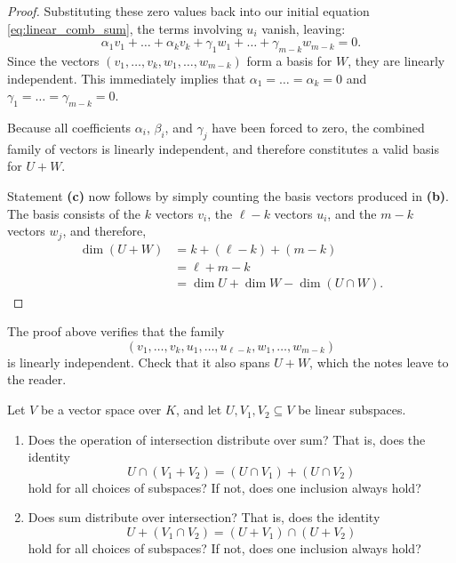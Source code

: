 \begin{proof}
Substituting these zero values back into our initial equation \eqref{eq:linear_comb_sum}, the terms involving $u_i$ vanish, leaving:
\[
\alpha_1 v_1 + \dots + \alpha_k v_k + \gamma_1 w_1 + \dots + \gamma_{m-k} w_{m-k} = 0.
\]
Since the vectors $(v_1, \dots, v_k, w_1, \dots, w_{m-k})$ form a basis for $W$, they are linearly independent. This immediately implies that $\alpha_1 = \dots = \alpha_k = 0$ and $\gamma_1 = \dots = \gamma_{m-k} = 0$. 

Because all coefficients $\alpha_i$, $\beta_i$, and $\gamma_j$ have been forced to zero, the combined family of vectors is linearly independent, and therefore constitutes a valid basis for $U + W$.

Statement \textbf{(c)} now follows by simply counting the basis vectors produced in \textbf{(b)}. The basis consists of the $k$ vectors $v_i$, the $\ell - k$ vectors $u_i$, and the $m - k$ vectors $w_j$, and therefore,
\begin{align*}
\dim(U + W) &= k + (\ell - k) + (m - k) \\
&= \ell + m - k \\
&= \dim U + \dim W - \dim(U \cap W).
\end{align*}
\end{proof}

\begin{exercise}
\label{exc:combined_family_spans}
The proof above verifies that the family
\[
(v_1, \dots, v_k, u_1, \dots, u_{\ell-k}, w_1, \dots, w_{m-k})
\]
is linearly independent. Check that it also spans $U + W$, which the notes leave to the reader.
\end{exercise}

\begin{exercise}
\label{exc:subspaces_distributivity}
Let $V$ be a vector space over $K$, and let $U, V_1, V_2 \subseteq V$ be linear subspaces.
\begin{enumerate}
    \item Does the operation of intersection distribute over sum? That is, does the identity
    \[
    U \cap (V_1 + V_2) = (U \cap V_1) + (U \cap V_2)
    \]
    hold for all choices of subspaces? If not, does one inclusion always hold?
    \item Does sum distribute over intersection? That is, does the identity
    \[
    U + (V_1 \cap V_2) = (U + V_1) \cap (U + V_2)
    \]
    hold for all choices of subspaces? If not, does one inclusion always hold?
\end{enumerate}
\end{exercise}

